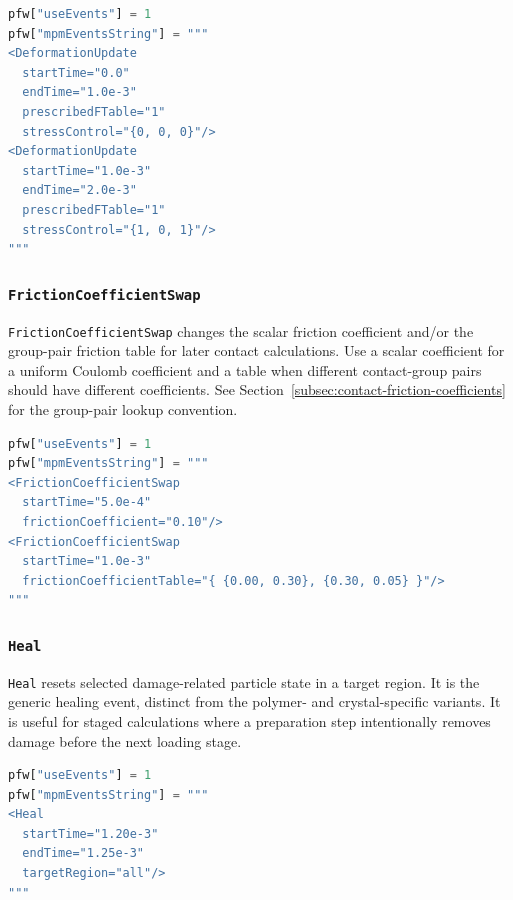 \begin{lstlisting}[language=Python,caption={Deformation-control update event.}]
pfw["useEvents"] = 1
pfw["mpmEventsString"] = """
<DeformationUpdate
  startTime="0.0"
  endTime="1.0e-3"
  prescribedFTable="1"
  stressControl="{0, 0, 0}"/>
<DeformationUpdate
  startTime="1.0e-3"
  endTime="2.0e-3"
  prescribedFTable="1"
  stressControl="{1, 0, 1}"/>
"""
\end{lstlisting}

\subsubsection{\texttt{FrictionCoefficientSwap}}

\texttt{FrictionCoefficientSwap} changes the scalar friction coefficient and/or the group-pair friction table for later contact calculations.  Use a scalar coefficient for a uniform Coulomb coefficient and a table when different contact-group pairs should have different coefficients.  See Section~\ref{subsec:contact-friction-coefficients} for the group-pair lookup convention.

\begin{lstlisting}[language=Python,caption={Friction-coefficient swap event.}]
pfw["useEvents"] = 1
pfw["mpmEventsString"] = """
<FrictionCoefficientSwap
  startTime="5.0e-4"
  frictionCoefficient="0.10"/>
<FrictionCoefficientSwap
  startTime="1.0e-3"
  frictionCoefficientTable="{ {0.00, 0.30}, {0.30, 0.05} }"/>
"""
\end{lstlisting}

\subsubsection{\texttt{Heal}}

\texttt{Heal} resets selected damage-related particle state in a target region.  It is the generic healing event, distinct from the polymer- and crystal-specific variants.  It is useful for staged calculations where a preparation step intentionally removes damage before the next loading stage.

\begin{lstlisting}[language=Python,caption={Generic heal event.}]
pfw["useEvents"] = 1
pfw["mpmEventsString"] = """
<Heal
  startTime="1.20e-3"
  endTime="1.25e-3"
  targetRegion="all"/>
"""
\end{lstlisting}

